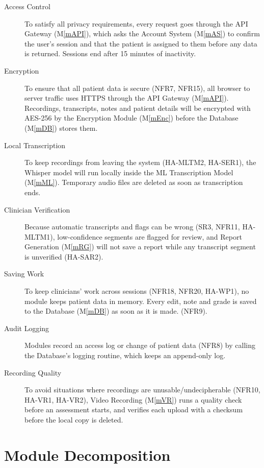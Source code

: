 \documentclass[12pt, titlepage]{article}
\newcommand{\mref}[1]{M\ref{#1}}
\begin{document}
\begin{description}
\item[Access Control] To satisfy all privacy requirements, every request goes through the API Gateway (\mref{mAPI}), which asks the Account System (\mref{mAS}) to confirm the user's session and that the patient is assigned to them before any data is returned. Sessions end after 15 minutes of inactivity.

\item[Encryption] To ensure that all patient data is secure (NFR7, NFR15), all browser to server traffic uses HTTPS through the API Gateway (\mref{mAPI}). Recordings, transcripts, notes and patient details will be encrypted with AES-256 by the Encryption Module (\mref{mEnc}) before the Database (\mref{mDB}) stores them.

\item[Local Transcription] To keep recordings from leaving the system (HA-MLTM2, HA-SER1), the Whisper model will run locally inside the ML Transcription Model (\mref{mML}). Temporary audio files are deleted as soon as transcription ends.

\item[Clinician Verification] Because automatic transcripts and flags can be wrong (SR3, NFR11, HA-MLTM1), low-confidence segments are flagged for review, and Report Generation (\mref{mRG}) will not save a report while any transcript segment is unverified (HA-SAR2).

\item[Saving Work] To keep clinicians' work across sessions (NFR18, NFR20, HA-WP1), no module keeps patient data in memory. Every edit, note and grade is saved to the Database (\mref{mDB}) as soon as it is made. (NFR9).

\item[Audit Logging] Modules record an access log or change of patient data (NFR8) by calling the Database's logging routine, which keeps an append-only log.

\item[Recording Quality] To avoid situations where recordings are unusable/undecipherable (NFR10, HA-VR1, HA-VR2), Video Recording (\mref{mVR}) runs a quality check before an assessment starts, and verifies each upload with a checksum before the local copy is deleted.
\end{description}

\section{Module Decomposition} \label{SecMD}
\end{document}
